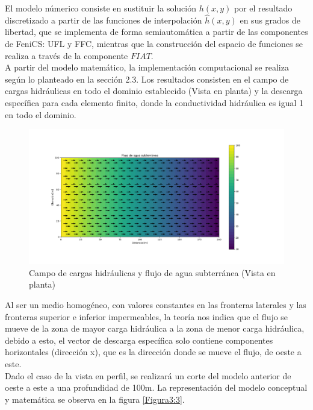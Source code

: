 El modelo númerico consiste en sustituir la solución $h(x,y)$ por el resultado discretizado a partir de las funciones de interpolación $\hat{h}(x,y)$ en sus grados de libertad, que se implementa de forma semiautomática a partir de las componentes de FeniCS: UFL y FFC, mientras que la construcción del espacio de funciones se realiza a través de la componente $FIAT$. 
\\

A partir del modelo matemático, la implementación computacional se realiza según lo planteado en la sección 2.3. Los resultados consisten en el campo de cargas hidráulicas en todo el dominio establecido (Vista en planta) y la descarga específica para cada elemento finito, donde la conductividad hidráulica es igual 1 en todo el dominio.
 \\

 \begin{figure}[H]
\centering
\includegraphics[scale=0.50]{Figura_26.png}
\caption{ Campo de cargas hidráulicas y flujo de agua subterránea (Vista en planta)}
\label{Figura20:2}
\end{figure}

Al ser un medio homogéneo, con valores constantes en las fronteras laterales y las fronteras superior e inferior impermeables, la teoría nos indica que el flujo se mueve de la zona de mayor carga hidráulica a la zona de menor carga hidráulica, debido a esto, el vector de descarga específica solo contiene componentes horizontales (dirección x), que es la dirección donde se mueve el flujo, de oeste a este. 
\\

Dado el caso de la vista en perfil, se realizará un corte del modelo anterior de oeste a este a una profundidad de 100m. La representación del modelo conceptual y matemática se observa en la figura \ref{Figura3:3}.

